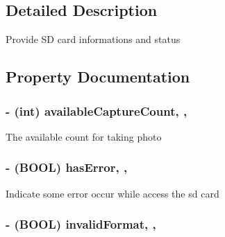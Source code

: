 \subsection{Detailed Description}
Provide S\+D card informations and status 

\subsection{Property Documentation}
\hypertarget{interface_d_j_i_camera_s_d_card_info_a27f92f3e797ec9a590ac62545d8c3d03}{
\subsubsection[{available\+Capture\+Count}]{\setlength{\rightskip}{0pt plus 5cm}-\/ (int) available\+Capture\+Count\hspace{0.3cm}{\ttfamily [read]}, {\ttfamily [nonatomic]}, {\ttfamily [assign]}}}\label{interface_d_j_i_camera_s_d_card_info_a27f92f3e797ec9a590ac62545d8c3d03}
The available count for taking photo \hypertarget{interface_d_j_i_camera_s_d_card_info_a0fb344a71d20c3f43bb4b68c51300cbb}{
\subsubsection[{has\+Error}]{\setlength{\rightskip}{0pt plus 5cm}-\/ (B\+O\+O\+L) has\+Error\hspace{0.3cm}{\ttfamily [read]}, {\ttfamily [nonatomic]}, {\ttfamily [assign]}}}\label{interface_d_j_i_camera_s_d_card_info_a0fb344a71d20c3f43bb4b68c51300cbb}
Indicate some error occur while access the sd card \hypertarget{interface_d_j_i_camera_s_d_card_info_af79c37797d1d0eb7e2b132b217a94290}{
\subsubsection[{invalid\+Format}]{\setlength{\rightskip}{0pt plus 5cm}-\/ (B\+O\+O\+L) invalid\+Format\hspace{0.3cm}{\ttfamily [read]}, {\ttfamily [nonatomic]}, {\ttfamily [assign]}}}\label{interface_d_j_i_camera_s_d_card_info_af79c37797d1d0eb7e2b132b217a94290}
